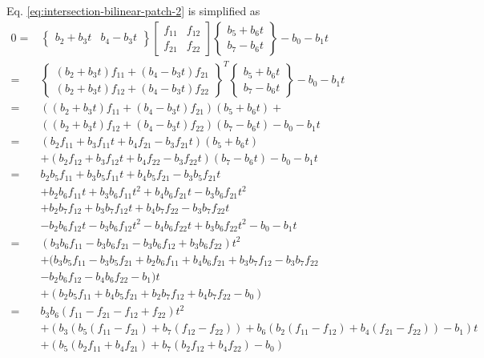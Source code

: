 \documentclass[
10pt, %
a4paper, %
oneside, %
headinclude,footinclude, %
BCOR5mm, %
]{scrartcl}
\begin{document}
Eq. \eqref{eq:intersection-bilinear-patch-2} is simplified as
\begin{equation}
  \label{eq:intersection-bilinear-patch-3}
\begin{split}
  0 =&
    \begin{Bmatrix}
      b_2 + b_3 t & b_4 - b_3 t
    \end{Bmatrix}
    \begin{bmatrix}
      f_{11} & f_{12}\\
      f_{21} & f_{22}
    \end{bmatrix}
    \begin{Bmatrix}
      b_5 + b_6 t \\
      b_7 - b_6 t
    \end{Bmatrix} - b_0 - b_1t\\
  =&
  \begin{Bmatrix}
    (b_2 + b_3 t) f_{11} + (b_4 - b_3t) f_{21} \\
    (b_2 + b_3 t) f_{12} + (b_4 - b_3t) f_{22}
  \end{Bmatrix}^T
  \begin{Bmatrix}
    b_5 + b_6 t \\
    b_7 - b_6 t
  \end{Bmatrix} - b_0 - b_1t\\
  =&
  ((b_2 + b_3 t) f_{11} + (b_4 - b_3t) f_{21})(b_5 + b_6t) + \\
  & ((b_2 + b_3 t) f_{12} + (b_4 - b_3t) f_{22})(b_7 - b_6t) - b_0 - b_1t\\
  =&
  (b_2 f_{11} + b_3 f_{11} t + b_4 f_{21} - b_3 f_{21} t) (b_5 + b_6 t) \\
  & + (b_2 f_{12} + b_3 f_{12} t + b_4 f_{22} - b_3 f_{22} t) (b_7 - b_6 t) - b_0 - b_1 t\\
  =&
  b_2 b_5 f_{11} + b_3 b_5 f_{11} t + b_4 b_5 f_{21} - b_3 b_5 f_{21} t\\
  & + b_2 b_6 f_{11} t + b_3 b_6 f_{11} t^2 + b_4 b_6 f_{21} t - b_3 b_6 f_{21} t^2 \\
  &+ b_2 b_7 f_{12} + b_3 b_7 f_{12} t + b_4 b_7 f_{22} - b_3 b_7 f_{22} t \\
  &-b_2 b_6 f_{12} t - b_3 b_6 f_{12} t^2 - b_4 b_6 f_{22} t + b_3 b_6 f_{22} t^2 - b_0 - b_1 t\\
  =&
  (b_3 b_6 f_{11} - b_3 b_6 f_{21} - b_3 b_6 f_{12} + b_3 b_6 f_{22}) t^2 \\ & + (b_3 b_5 f_{11} - b_3 b_5 f_{21} + b_2 b_6 f_{11} + b_4 b_6 f_{21} + b_3 b_7 f_{12} - b_3 b_7 f_{22}\\
  & - b_2 b_6 f_{12} - b_4 b_6 f_{22} - b_1) t \\
  & + (b_2 b_5 f_{11} + b_4 b_5 f_{21} + b_2 b_7 f_{12} + b_4 b_7 f_{22} - b_0)\\
  =&
  b_3 b_6 (f_{11} - f_{21} - f_{12} + f_{22}) t^2 \\
  & + (b_3 (b_5 (f_{11} - f_{21}) + b_7(f_{12} - f_{22})) + b_6 ( b_2 (f_{11}   - f_{12}) + b_4 (f_{21} - f_{22})) - b_1) t\\
  & + (b_5 (b_2 f_{11} + b_4 f_{21}) + b_7 (b_2 f_{12} + b_4 f_{22}) - b_0)
\end{split}
\end{equation}
\end{document}
